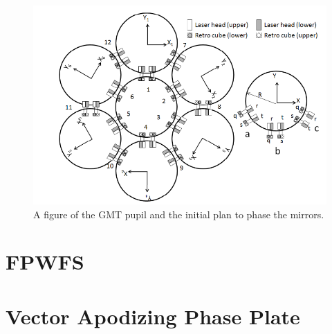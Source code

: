 \begin{figure}[H]
\centering
\includegraphics[width=12 cm]{Figures/GMT_phase_measure.png}
\caption{A figure of the GMT pupil and the initial plan to phase the mirrors\cite{Acton2012PhasingGMT}.}
\label{fig:GMT_phase}
\end{figure}



\section{FPWFS}
\label{sec:fpwfs}



\section{Vector Apodizing Phase Plate}
\label{sec:vAPP}








